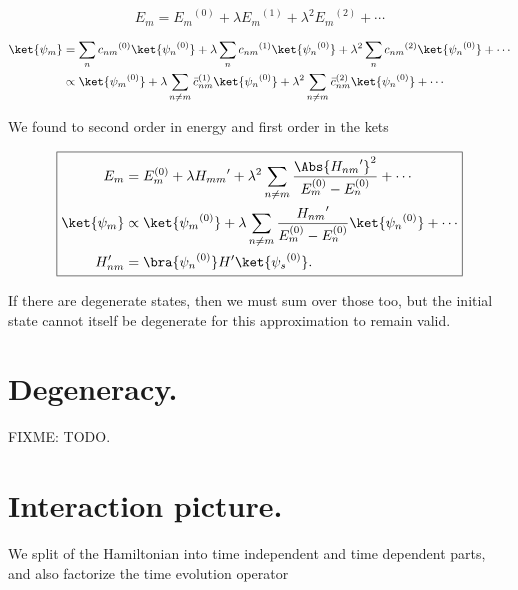 \begin{equation}\label{eqn:qmTwoReview:n}
E_m = {E_m}^{(0)} + \lambda {E_m}^{(1)} + \lambda^2 {E_m}^{(2)} + \cdots
\end{equation}

\begin{equation}\label{eqn:qmTwoL4:130}
\begin{aligned}
\ket{\psi_m} &= 
\sum_n {c_{nm}}^{(0)} \ket{{\psi_n}^{(0)}} 
+
\lambda
\sum_n {c_{nm}}^{(1)} \ket{{\psi_n}^{(0)}} 
+ 
\lambda^2
\sum_n {c_{nm}}^{(2)} \ket{{\psi_n}^{(0)}} 
+ \cdots \\
&\propto
\ket{{\psi_m}^{(0)}} 
+ 
\lambda
\sum_{n \ne m} {\bar{c}_{nm}}^{(1)} \ket{{\psi_n}^{(0)}} 
+
\lambda^2
\sum_{n \ne m} {\bar{c}_{nm}}^{(2)} \ket{{\psi_n}^{(0)}} 
+ \cdots
\end{aligned}
\end{equation}

We found to second order in energy and first order in the kets

\begin{equation}\label{eqn:qmTwoReview:n}
\boxed{
\begin{aligned}
E_m &= E_m^{(0)} + \lambda {H_{mm}}' + \lambda^2 
\sum_{n \ne m} 
\frac{\Abs{{H_{nm}}'}^2 }
{ E_m^{(0)} - E_n^{(0)} } 
+ \cdots
\\
\ket{\psi_m} &\propto \ket{{\psi_m}^{(0)}} + \lambda
\sum_{n \ne m} 
\frac{{H_{nm}}'}
{ E_m^{(0)} - E_n^{(0)} } \ket{{\psi_n}^{(0)}}
+ \cdots \\
H_{nm}' &=
\bra{{\psi_n}^{(0)}}
H'
\ket{{\psi_s}^{(0)}}.
\end{aligned}
}
\end{equation}

If there are degenerate states, then we must sum over those too, but the initial state cannot itself be degenerate for this approximation to remain valid.

\section{Degeneracy.}

FIXME: TODO.

\section{Interaction picture.}

We split of the Hamiltonian into time independent and time dependent parts, and also factorize the time evolution operator

